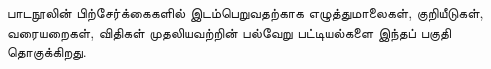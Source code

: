 \documentclass[../../include/open-logic-part]{subfiles}
\begin{document}

\begin{editorial}
  பாடநூலின் பிற்சேர்க்கைகளில் இடம்பெறுவதற்காக எழுத்துமாலைகள்,
  குறியீடுகள், வரையறைகள், விதிகள் முதலியவற்றின் பல்வேறு பட்டியல்களை
  இந்தப் பகுதி தொகுக்கிறது.
\end{editorial}



\OLEndPartHook
\end{document}
